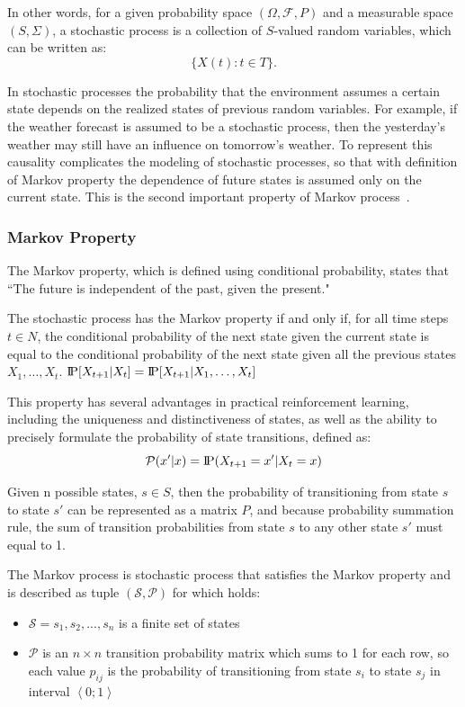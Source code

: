 \documentclass[../xlapes02]{subfiles}
\begin{document}
    In other words, for a given probability space $(\Omega, \mathcal{F}, P)$ and a measurable space $(S, \Sigma)$, a stochastic process is a collection of $S$-valued random variables, which can be written as:~\cite{enwiki:1148510872}
    \[
        \{X(t) : t \in T\}.
    \]

    In stochastic processes the probability that the environment assumes a certain state depends on the realized states of previous random variables. For example, if the weather forecast is assumed to be a stochastic process, then the yesterday’s weather may still have an influence on tomorrow’s weather. To represent this causality complicates the modeling of stochastic processes, so that with definition of Markov property the dependence of future states is assumed only on the current state. This is the second important property of Markov process~\cite{FITMT25127}.

    \subsubsection{Markov Property}\label{subsubsec:markov-property}
    The Markov property, which is defined using conditional probability, states that ``The future is independent of the past, given the present."

    The stochastic process has the Markov property if and only if, for all time steps $t \in N$, the conditional probability of the next state given the current state is equal to the conditional probability of the next state given all the previous states $X_1, \ldots, X_t$. $\text{I\kern-0.15em P}[X_{t+1}|X_t] = \text{I\kern-0.15em P}[X_{t+1}|X_1,\ldots,X_t]$

    This property has several advantages in practical reinforcement learning, including the uniqueness and distinctiveness of states, as well as the ability to precisely formulate the probability of state transitions, defined as:~\cite{FITMT25127}
    \begin{equation}
        \mathcal{P}(x'|x)=\text{I\kern-0.15em P}(X_{t+1}=x'|X_t=x)
    \end{equation}

    Given n possible states, $s\in S$, then the probability of transitioning from state $s$ to state $s'$ can be represented as a matrix $P$, and because probability summation rule, the sum of transition probabilities from state $s$ to any other state $s'$ must equal to 1.

    \begin{definition}
        The Markov process is stochastic process that satisfies the Markov property and is described as tuple $\left(\mathcal{S}, \mathcal{P}\right)$ for which holds:\cite{ABATE2021102207}
        \begin{itemize}
            \item $\mathcal{S} = s_1, s_2, ..., s_n$ is a finite set of states
            \item $\mathcal{P}$ is an $n\times n$ transition probability matrix which sums to 1 for each row, so each value $p_{ij}$ is the probability of transitioning from state $s_i$ to state $s_j$ in interval $\left< 0;1 \right>$
        \end{itemize}
    \end{definition}
\end{document}
